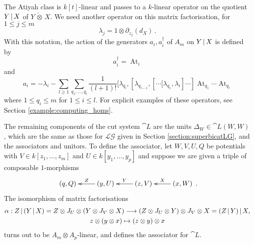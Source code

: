 \documentclass[english,letter paper,12pt,leqno]{article}
\theoremstyle{example}
\numberwithin{equation}{section}
\def\LG{\mathcal{LG}}
\DeclareMathOperator{\At}{At}
\begin{document}
The Atiyah class is $k[t]$-linear and passes to a $k$-linear operator on the quotient $Y \,|\, X$ of $Y \,\check{\otimes}\, X$. We need another operator on this matrix factorisation, for $1 \le j \le m$
\begin{equation}\label{eq:lambda_defn}
\lambda_j = 1 \otimes \partial_{z_j}(d_X)\,.
\end{equation}
With this notation, the action of the generators $a_i, a_i^\dagger$ of $A_m$ on $Y \,|\, X$ is defined by
\begin{equation}\label{eq:intro_clifford_act1}
a_i^\dagger = \At_i
\end{equation}
and
\begin{equation}\label{eq:intro_clifford_act2}
a_i = - \lambda_i - \sum_{l \ge 1} \sum_{q_1,\ldots,q_l} \frac{1}{(l+1)!} [ \lambda_{q_l}, [ \lambda_{q_{l-1}}, [ \cdots \big[ \lambda_{q_1}, \lambda_i ] \cdots ] \At_{q_1} \cdots \At_{q_l}
\end{equation}
where $1 \le q_i \le m$ for $1 \le i \le l$. For explicit examples of these operators, see Section \ref{example:computing_homs}.

The remaining components of the cut system $\cat{L}$ are the units $\Delta_W \in \cat{L}(W,W)$, which are the same as those for $\LG$ given in Section \ref{section:superbicatLG}, and the associators and unitors. To define the associator, let $W, V, U, Q$ be potentials with $V \in k[z_1,\ldots,z_m]$ and $U \in k[y_1,\ldots,y_p]$ and suppose we are given a triple of composable $1$-morphisms
\begin{equation}\label{eq:composable_triple}
\xymatrix{
(q, Q) & (y, U) \ar[l]_-{Z} & (z,V) \ar[l]_-{Y} & (x,W) \ar[l]_-{X}
}\,.
\end{equation}
The isomorphism of matrix factorisations
\begin{gather*}
\alpha: Z \,|\, (Y \,|\, X) = Z \otimes J_U \otimes ( Y \otimes J_V \otimes X ) \longrightarrow (Z \otimes J_U \otimes Y) \otimes J_V \otimes X = (Z \,|\, Y) \,|\, X,\\
z \otimes (y \otimes x) \mapsto (z \otimes y) \otimes x
\end{gather*}
turns out to be $A_m \otimes A_p$-linear, and defines the associator for $\cat{L}$.
\end{document}
